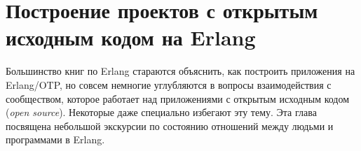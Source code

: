 \documentclass[11pt, oneside]{book}   	%
\begin{document}


\chapter{Построение проектов с открытым исходным кодом на Erlang}
\label{chap:building-open-source-erlang-software}

Большинство книг по Erlang стараются объяснить, как построить приложения на Erlang/OTP, но совсем немногие углубляются в вопросы взаимодействия с сообществом, которое работает над приложениями с открытым исходным кодом (\emph{open source}). Некоторые даже специально избегают эту тему. Эта глава посвящена небольшой экскурсии по состоянию отношений между людьми и программами в Erlang.
\end{document}
